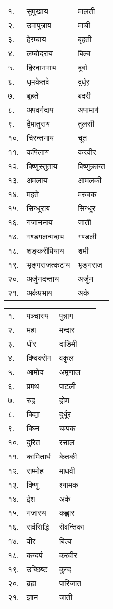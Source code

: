 \begin{center}
\begin{longtable}{ll@{~नमः — }l@{-पत्रं समर्पयामि}}
    १. & सुमुखाय & मालती\\
    २. & उमापुत्राय & माची\\
    ३. & हेरम्बाय & बृहती\\
    ४. & लम्बोदराय & बिल्व\\
    ५. & द्विरदाननाय & दूर्वा\\
    ६. & धूमकेतवे & दुर्धूर\\
    ७. & बृहते & बदरी\\
    ८. & अपवर्गदाय & अपामार्ग\\
    ९. & द्वैमातुराय & तुलसी\\
    १०. & चिरन्तनाय & चूत\\
    ११. & कपिलाय & करवीर\\
    १२. & विष्णुस्तुताय & विष्णुक्रान्त\\
    १३. & अमलाय & आमलकी\\
    १४. & महते & मरुवक\\
    १५. & सिन्धूराय & सिन्धूर\\
    १६. & गजाननाय & जाती\\
    १७. & गण्डगलन्मदाय & गण्डली\\
    १८. & शङ्करीप्रियाय & शमी\\
    १९. & भृङ्गराजत्कटाय & भृङ्गराज\\
    २०. & अर्जुनदन्ताय & अर्जुन\\
    २१. & अर्कप्रभाय & अर्क\\
\end{longtable}


\begin{longtable}{ll@{-गणपतये नमः — }ll@{-पुष्पं समर्पयामि}}
    १. & पञ्चास्य & पुन्नाग&\\
    २. & महा & मन्दार&\\
    ३. & धीर & दाडिमी&\\
    ४. & विष्वक्सेन & वकुल&\\
    ५. & आमोद & अमृणाल&\\
    ६. & प्रमथ & पाटली&\\
    ७. & रुद्र & द्रोण&\\
    ८. & विद्या & दुर्धूर&\\
    ९. & विघ्न & चम्पक&\\
    १०. & दुरित & रसाल&\\
    ११. & कामितार्थ & केतकी&\\
    १२. & सम्मोह & माधवी&\\
    १३. & विष्णु & श्यामक&\\
    १४. & ईश & अर्क&\\
    १५. & गजास्य & कह्लार&\\
    १६. & सर्वसिद्धि & सेवन्तिका&\\
    १७. & वीर & बिल्व&\\
    १८. & कन्दर्प & करवीर&\\
    १९. & उच्छिष्ट & कुन्द&\\
    २०. & ब्रह्म & पारिजात&\\
    २१. & ज्ञान & जाती&\\
\end{longtable}


\end{center}
